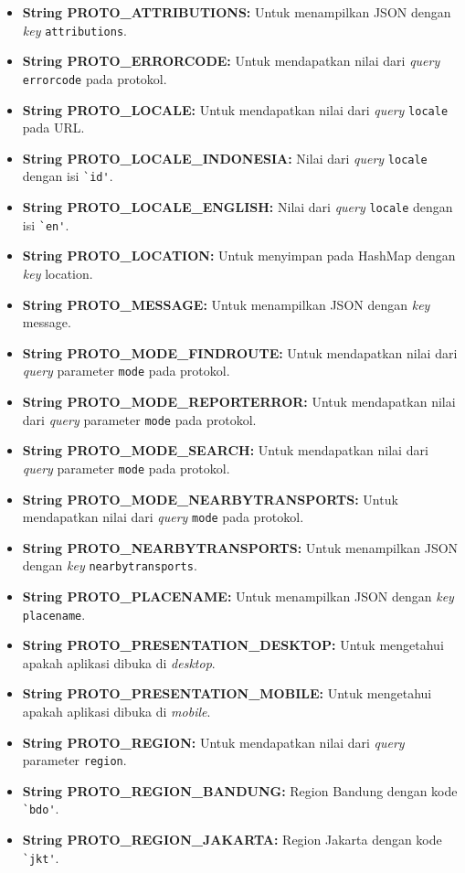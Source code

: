 \begin{enumerate}
\begin{itemize}
		\item \textbf{String PROTO\_ATTRIBUTIONS:} Untuk menampilkan JSON dengan \textit{key} \verb!attributions!. 
		\item \textbf{String PROTO\_ERRORCODE:} Untuk mendapatkan nilai dari \textit{query} \verb!errorcode! pada protokol.
		\item \textbf{String PROTO\_LOCALE:} Untuk mendapatkan nilai dari \textit{query} \verb!locale! pada URL.
		\item \textbf{String PROTO\_LOCALE\_INDONESIA:} Nilai dari \textit{query} \verb!locale! dengan isi \verb!`id'!.
		\item \textbf{String PROTO\_LOCALE\_ENGLISH:} Nilai dari \textit{query} \verb!locale! dengan isi \verb!`en'!.
		\item \textbf{String PROTO\_LOCATION:} Untuk menyimpan pada HashMap dengan \textit{key} location.
		\item \textbf{String PROTO\_MESSAGE:} Untuk menampilkan JSON dengan \textit{key} message.
		\item \textbf{String PROTO\_MODE\_FINDROUTE:} Untuk mendapatkan nilai dari \textit{query} parameter \verb!mode! pada protokol.
		\item \textbf{String PROTO\_MODE\_REPORTERROR:} Untuk mendapatkan nilai dari \textit{query} parameter \verb!mode! pada protokol.
		\item \textbf{String PROTO\_MODE\_SEARCH:} Untuk mendapatkan nilai dari \textit{query} parameter \verb!mode! pada protokol.
		\item \textbf{String PROTO\_MODE\_NEARBYTRANSPORTS:} Untuk mendapatkan nilai dari \textit{query}  \verb!mode! pada protokol.
		\item \textbf{String PROTO\_NEARBYTRANSPORTS:} Untuk menampilkan JSON dengan \textit{key} \verb!nearbytransports!.
		\item \textbf{String PROTO\_PLACENAME:} Untuk menampilkan JSON dengan \textit{key} \verb!placename!.
		\item \textbf{String PROTO\_PRESENTATION\_DESKTOP:} Untuk mengetahui apakah aplikasi dibuka di \textit{desktop}.
		\item \textbf{String PROTO\_PRESENTATION\_MOBILE:} Untuk mengetahui apakah aplikasi dibuka di \textit{mobile}.
		\item \textbf{String PROTO\_REGION:} Untuk mendapatkan nilai dari \textit{query} parameter \verb!region!.
		\item \textbf{String PROTO\_REGION\_BANDUNG:} Region Bandung dengan kode \verb!`bdo'!.
		\item \textbf{String PROTO\_REGION\_JAKARTA:} Region Jakarta dengan kode \verb!`jkt'!.

\end{itemize}
\end{enumerate}
